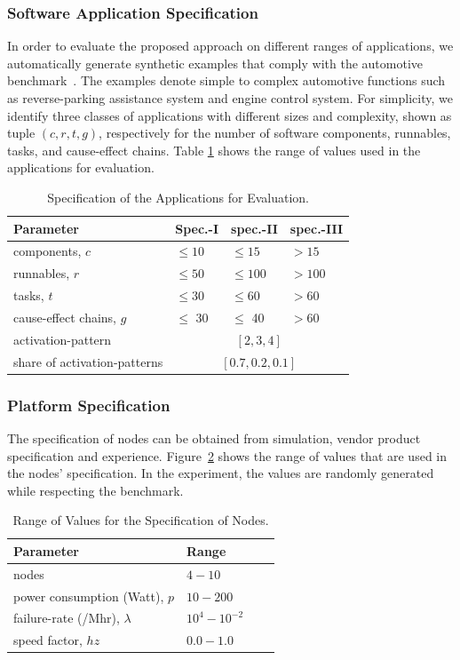 \subsubsection{Software Application Specification} In order to evaluate the proposed approach on different ranges of applications, we automatically generate synthetic examples that comply with the automotive benchmark~\cite{Kramer2015RealFree}. The examples denote simple to complex automotive functions such as reverse-parking assistance system and engine control system. For simplicity, we identify three classes of applications with different sizes and complexity, shown as tuple $(c, r, t, g)$, respectively for the number of software components, runnables, tasks, and cause-effect chains. Table \ref{tbl_appsspec} shows the range of values used in the applications for evaluation. 
\begin{table}[h]
\centering\small
\begin{tabular}{@{}llll@{}}
\toprule
Parameter  		& Spec.-I  & spec.-II & spec.-III\\ 
\midrule
components, $c$		& $\leq 10$	& $\leq 15$ 	& $> 15$\\ 
runnables, $r$		& $\leq 50$	& $\leq 100$ 	& $> 100$\\
tasks, $t$ 			& $\leq 30$ & $\leq 60$ 	& $> 60$\\
cause-effect chains, $g$ & $\leq$ 30 & $\leq$ 40 & $> 60$\\ \midrule
activation-pattern	& \multicolumn{3}{c}{$[2,3,4]$}\\ \midrule
share of activation-patterns	& \multicolumn{3}{c}{$[0.7, 0.2, 0.1]$}\\
\bottomrule
\end{tabular}
\caption{Specification of the Applications for Evaluation.}
\label{tbl_appsspec}
\end{table}

\subsubsection{Platform Specification} The specification of nodes can be obtained from simulation, vendor product specification and  experience. Figure~\ref{tbl_nodesspecs} shows the range of values that are used in the nodes' specification. In the experiment, the values are randomly generated while respecting the benchmark.
\begin{table}[h]
\centering\small
\begin{tabular}{@{}llll@{}}
\toprule
Parameter  		& Range\\ 
\midrule
nodes							& $4-10$\\
power consumption (Watt), $p$ 	& $10 - 200$\\
failure-rate (/Mhr), $\lambda$ 	& $10^4 - 10^{-2}$\\
speed factor, $hz$			 	& $0.0 - 1.0$\\
\bottomrule
\end{tabular}
\caption{Range of Values for the Specification of Nodes.}
\label{tbl_nodesspecs}
\end{table}

